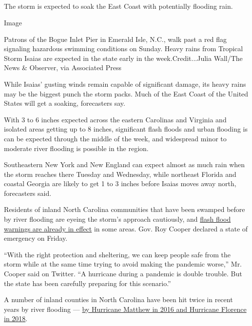 \hypertarget{-4}{%
\subsection{}\label{-4}}

The storm is expected to soak the East Coast with potentially flooding
rain.

Image

Patrons of the Bogue Inlet Pier in Emerald Isle, N.C., walk past a red
flag signaling hazardous swimming conditions on Sunday. Heavy rains from
Tropical Storm Isaias are expected in the state early in the
week.Credit...Julia Wall/The News \& Observer, via Associated Press

While Isaias' gusting winds remain capable of significant damage, its
heavy rains may be the biggest punch the storm packs. Much of the East
Coast of the United States will get a soaking, forecasters say.

With 3 to 6 inches expected across the eastern Carolinas and Virginia
and isolated areas getting up to 8 inches, significant flash floods and
urban flooding is can be expected through the middle of the week, and
widespread minor to moderate river flooding is possible in the region.

Southeastern New York and New England can expect almost as much rain
when the storm reaches there Tuesday and Wednesday, while northeast
Florida and coastal Georgia are likely to get 1 to 3 inches before
Isaias moves away north, forecasters said.

Residents of inland North Carolina communities that have been swamped
before by river flooding are eyeing the storm's approach cautiously, and
\href{https://alerts.weather.gov/cap/wwacapget.php?x=NC125F5DA2F1C4.HurricaneLocalStatement.125F5DA42AA8NC.ILMHLSILM.3d2f501b896f05f00166a758bf00288a}{flash
flood warnings are already in effect} in some areas. Gov. Roy Cooper
declared a state of emergency on Friday.

``With the right protection and sheltering, we can keep people safe from
the storm while at the same time trying to avoid making the pandemic
worse,'' Mr. Cooper said on Twitter. ``A hurricane during a pandemic is
double trouble. But the state has been carefully preparing for this
scenario.''

A number of inland counties in North Carolina have been hit twice in
recent years by river flooding ---
\href{https://www.nytimes3xbfgragh.onion/2018/09/18/us/north-carolina-hurricanes-storms-history.html}{by
Hurricane Matthew in 2016 and Hurricane Florence in 2018}.

